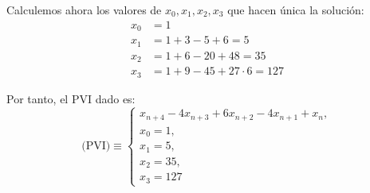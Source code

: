 \begin{ejercicio}
\begin{enumerate}
        Calculemos ahora los valores de $x_0,x_1,x_2,x_3$ que hacen única la solución:
        \begin{align*}
            x_0 &= 1 \\
            x_1 &= 1+3-5+6=5\\
            x_2 &= 1+6-20+48 = 35\\
            x_3 &= 1+9-45+27\cdot 6 = 127
        \end{align*}

        Por tanto, el PVI dado es:
        \begin{equation*}
            \text{(PVI)}\equiv \left\{ \begin{array}{l}
                x_{n+4} -4x_{n+3} +6x_{n+2}-4x_{n+1} +x_n,\\
                x_0=1,\\
                x_1=5,\\
                x_2=35,\\
                x_3=127
            \end{array}\right.
        \end{equation*}
    \end{enumerate}
\end{ejercicio}

